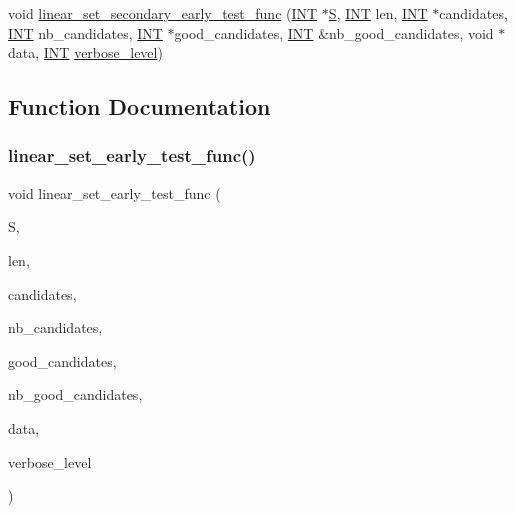 \begin{DoxyCompactItemize}
\item 
void \mbox{\hyperlink{linear__set_8_c_a18952a27859ea38d664fcaa5eda899d3}{linear\+\_\+set\+\_\+secondary\+\_\+early\+\_\+test\+\_\+func}} (\mbox{\hyperlink{galois_8h_a09fddde158a3a20bd2dcadb609de11dc}{I\+NT}} $\ast$\mbox{\hyperlink{simeon_8_c_adab47f8243f1b5a2c31df2535d6b37d0}{S}}, \mbox{\hyperlink{galois_8h_a09fddde158a3a20bd2dcadb609de11dc}{I\+NT}} len, \mbox{\hyperlink{galois_8h_a09fddde158a3a20bd2dcadb609de11dc}{I\+NT}} $\ast$candidates, \mbox{\hyperlink{galois_8h_a09fddde158a3a20bd2dcadb609de11dc}{I\+NT}} nb\+\_\+candidates, \mbox{\hyperlink{galois_8h_a09fddde158a3a20bd2dcadb609de11dc}{I\+NT}} $\ast$good\+\_\+candidates, \mbox{\hyperlink{galois_8h_a09fddde158a3a20bd2dcadb609de11dc}{I\+NT}} \&nb\+\_\+good\+\_\+candidates, void $\ast$data, \mbox{\hyperlink{galois_8h_a09fddde158a3a20bd2dcadb609de11dc}{I\+NT}} \mbox{\hyperlink{simeon_8_c_a818073fbcc2f439e7c56952f67386122}{verbose\+\_\+level}})
\end{DoxyCompactItemize}


\subsection{Function Documentation}
\mbox{\label{linear__set_8_c_a1ef4e3af78068bd4c49bf7d1509cf936}} 
\subsubsection{\texorpdfstring{linear\+\_\+set\+\_\+early\+\_\+test\+\_\+func()}{linear\_set\_early\_test\_func()}}
{\footnotesize\ttfamily void linear\+\_\+set\+\_\+early\+\_\+test\+\_\+func (\begin{DoxyParamCaption}\item[{\mbox{\hyperlink{galois_8h_a09fddde158a3a20bd2dcadb609de11dc}{I\+NT}} $\ast$}]{S,  }\item[{\mbox{\hyperlink{galois_8h_a09fddde158a3a20bd2dcadb609de11dc}{I\+NT}}}]{len,  }\item[{\mbox{\hyperlink{galois_8h_a09fddde158a3a20bd2dcadb609de11dc}{I\+NT}} $\ast$}]{candidates,  }\item[{\mbox{\hyperlink{galois_8h_a09fddde158a3a20bd2dcadb609de11dc}{I\+NT}}}]{nb\+\_\+candidates,  }\item[{\mbox{\hyperlink{galois_8h_a09fddde158a3a20bd2dcadb609de11dc}{I\+NT}} $\ast$}]{good\+\_\+candidates,  }\item[{\mbox{\hyperlink{galois_8h_a09fddde158a3a20bd2dcadb609de11dc}{I\+NT}} \&}]{nb\+\_\+good\+\_\+candidates,  }\item[{void $\ast$}]{data,  }\item[{\mbox{\hyperlink{galois_8h_a09fddde158a3a20bd2dcadb609de11dc}{I\+NT}}}]{verbose\+\_\+level }\end{DoxyParamCaption})}

